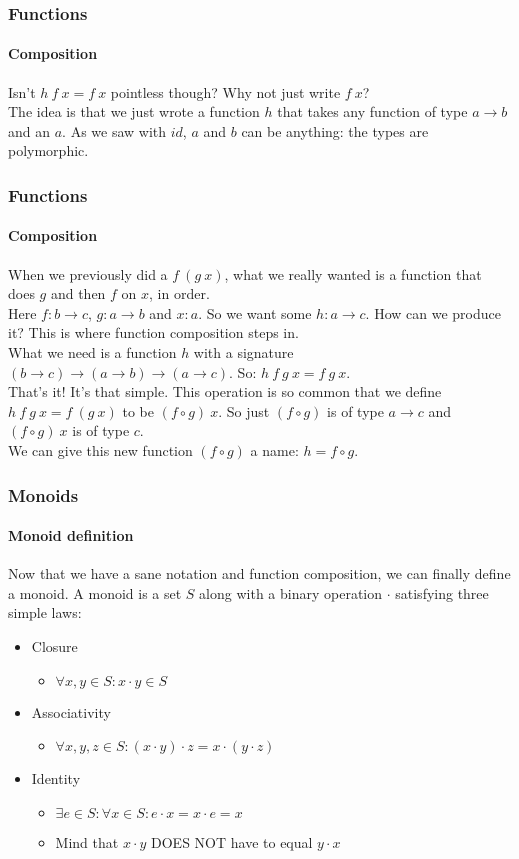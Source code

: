\documentclass{beamer}
\begin{document}
\begin{frame}
  \frametitle{Functions}
  \framesubtitle{Composition}
  Isn't $h\:f\:x = f\:x$ pointless though? Why not just write $f\:x$?\\
  \pause
  The idea is that we just wrote a function $h$ that takes any
  function of type $a \rightarrow b$ and an $a$. As we saw with $id$,
  $a$ and $b$ can be anything: the types are polymorphic.
\end{frame}
\begin{frame}
  \frametitle{Functions}
  \framesubtitle{Composition}
  When we previously did a $f\:(g\:x)$, what we really wanted is a
  function that does $g$ and then $f$ on $x$, in order.\\
  Here $f:b \rightarrow c$, $g:a \rightarrow b$ and $x:a$.
  \pause
  So we want some $h:a \rightarrow c$. How can we produce it? This is
  where function composition steps in.\\
  \pause
  What we need is a function $h$ with a signature $(b \rightarrow c)
  \rightarrow (a \rightarrow b) \rightarrow (a \rightarrow c)$.
  So: $h\:f\:g\:x = f\:g\:x$.\\
  \pause
  That's it! It's that simple. This operation is so common that we
  define $h\:f\:g\:x = f\:(g\:x)$ to be $(f \circ g)\:x$. So just $(f
  \circ g)$ is of type $a \rightarrow c$ and $(f \circ g)\:x$ is of
  type $c$.\\
  \pause
  We can give this new function $(f \circ g)$ a name: $h = f \circ g$.
\end{frame}
\begin{frame}
  \frametitle{Monoids}
  \framesubtitle{Monoid definition}
  Now that we have a sane notation and function composition, we can
  finally define a monoid. A monoid is a set $S$ along with a binary
  operation $\cdot$ satisfying three simple laws:
  \pause
  \begin{itemize}[<+->]
    \item Closure
      \begin{itemize}
        \item $\forall x,y \in S: x \cdot y \in S$
      \end{itemize}
    \item Associativity
      \begin{itemize}
        \item $\forall x,y,z \in S: (x \cdot y) \cdot z = x \cdot (y
          \cdot z)$
      \end{itemize}
    \item Identity
      \begin{itemize}
        \item $\exists e \in S: \forall x \in S: e \cdot x = x \cdot e
          = x$
        \item Mind that $x \cdot y$ DOES NOT have to equal $y \cdot x$
      \end{itemize}
  \end{itemize}
\end{frame}
\end{document}
